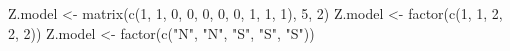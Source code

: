 \begin{Schunk}
\begin{Sinput}
 Z.model <- matrix(c(1, 1, 0, 0, 0, 0, 0, 1, 1, 1), 5, 2)
 Z.model <- factor(c(1, 1, 2, 2, 2))
 Z.model <- factor(c("N", "N", "S", "S", "S"))
\end{Sinput}
\end{Schunk}
